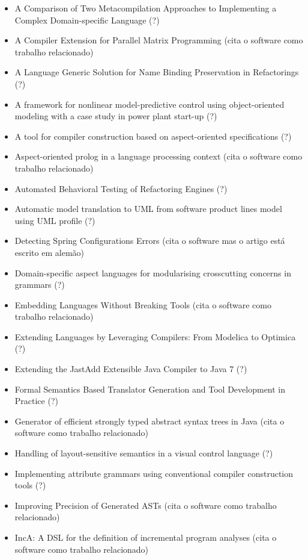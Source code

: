 \begin{itemize}
\item A Comparison of Two Metacompilation Approaches to Implementing a Complex Domain-specific Language (?)
\item A Compiler Extension for Parallel Matrix Programming (cita o software como trabalho relacionado)
\item A Language Generic Solution for Name Binding Preservation in Refactorings (?)
\item A framework for nonlinear model-predictive control using object-oriented modeling with a case study in power plant start-up (?)
\item A tool for compiler construction based on aspect-oriented specifications (?)
\item Aspect-oriented prolog in a language processing context (cita o software como trabalho relacionado)
\item Automated Behavioral Testing of Refactoring Engines (?)
\item Automatic model translation to UML from software product lines model using UML profile (?)
\item Detecting Spring Configurations Errors (cita o software mas o artigo está escrito em alemão)
\item Domain-specific aspect languages for modularising crosscutting concerns in grammars (?)
\item Embedding Languages Without Breaking Tools (cita o software como trabalho relacionado)
\item Extending Languages by Leveraging Compilers: From Modelica to Optimica (?)
\item Extending the JastAdd Extensible Java Compiler to Java 7 (?)
\item Formal Semantics Based Translator Generation and Tool Development in Practice (?)
\item Generator of efficient strongly typed abstract syntax trees in Java (cita o software como trabalho relacionado)
\item Handling of layout-sensitive semantics in a visual control language (?)
\item Implementing attribute grammars using conventional compiler construction tools (?)
\item Improving Precision of Generated ASTs (cita o software como trabalho relacionado)
\item IncA: A DSL for the definition of incremental program analyses (cita o software como trabalho relacionado)

\end{itemize}
